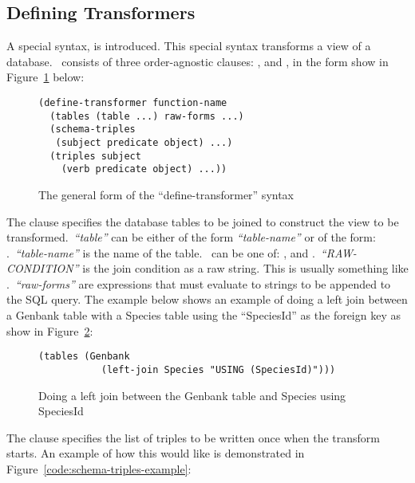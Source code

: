 \subsection{Defining Transformers}

A special syntax,  is introduced.  This special syntax transforms a view of a database.\    consists of three order-agnostic clauses: ,  and , in the form show in Figure~\ref{code:define-transformer-syntax} below:

\begin{figure}[H]
\centering
\begin{verbatim}
(define-transformer function-name
  (tables (table ...) raw-forms ...)
  (schema-triples
   (subject predicate object) ...)
  (triples subject
    (verb predicate object) ...))
\end{verbatim}
\caption{The general form of the ``define-transformer'' syntax}\label{code:define-transformer-syntax}
\end{figure}

The  clause specifies the database tables to be joined to construct the view to be transformed.\   \textit{``table''} can be either of the form \textit{``table-name''} or of the form: .\   \textit{``table-name''} is the name of the table.\    can be one of: ,  and .\   \textit{``RAW-CONDITION''} is the join condition as a raw string.  This is usually something like .\   \textit{``raw-forms''} are expressions that must evaluate to strings to be appended to the SQL query.  The example below shows an example of doing a left join between a Genbank table with a Species table using the ``SpeciesId'' as the foreign key as show in Figure~\ref{code:genbank-species-join-example}:

\begin{figure}[H]
\centering
\begin{verbatim}
(tables (Genbank
           (left-join Species "USING (SpeciesId)")))
\end{verbatim}
\caption{Doing a left join between the Genbank table and Species using SpeciesId}\label{code:genbank-species-join-example}
\end{figure}

The  clause specifies the list of triples to be written once when the transform starts.  An example of how this would like is demonstrated in Figure~\ref{code:schema-triples-example}:

